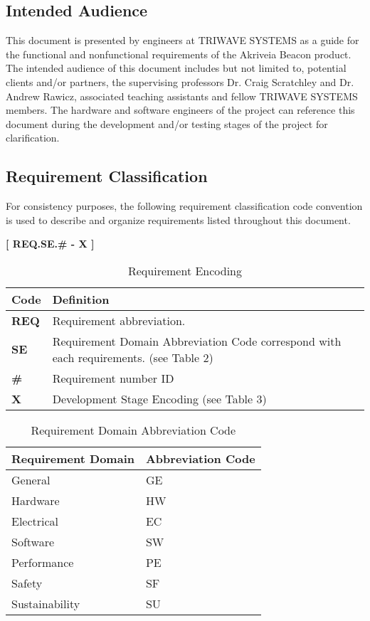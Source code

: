 \bigskip
\subsection{Intended Audience}
This document is presented by engineers at TRIWAVE SYSTEMS as a guide for the functional and nonfunctional requirements of the Akriveia Beacon product. The intended audience of this document includes but not limited to, potential clients and/or partners, the supervising professors Dr. Craig Scratchley and Dr. Andrew Rawicz, associated teaching assistants and fellow TRIWAVE SYSTEMS members. The hardware and software engineers of the project can reference this document during the development and/or testing stages of the project for clarification.

\break

\subsection{Requirement Classification}
For consistency purposes, the following requirement classification code convention is used to describe and organize requirements listed throughout this document. 
\medskip
\begin{center}
	\textbf{[ REQ.SE.\# - X ]} 
\end{center}

\bgroup
\def\arraystretch{1.5}
\begin{table}[H]
\centering
\begin{tabular}{ | m{1cm} | m{13cm}| } 
\hline
\rowcolor{lightgray} \textbf{Code} & \textbf{Definition} \\ 
\hline
 \textbf{REQ} & Requirement abbreviation.  \\ 
\hline
 \textbf{SE} & Requirement Domain Abbreviation Code correspond with each requirements. (see Table 2)\\   
\hline
 \textbf{\#} & Requirement number ID \\ 
\hline
 \textbf{X} & Development Stage Encoding (see Table 3)\\ 
\hline
\end{tabular}
\caption{Requirement Encoding}
\end{table}

\bgroup
\def\arraystretch{1.5}
\begin{table}[H]
\centering
\begin{tabular}{ | m{7cm} | m{7cm}| } 
\hline
\rowcolor{lightgray} \textbf{Requirement Domain} & \textbf{Abbreviation Code} \\ 
\hline
 General & GE\\ 
\hline
 Hardware & HW\\ 
\hline
 Electrical & EC\\  
\hline
 Software & SW\\ 
\hline
 Performance & PE\\ 
\hline
 Safety & SF\\ 
\hline
 Sustainability & SU\\ 
\hline
\end{tabular}
\caption{Requirement Domain Abbreviation Code}
\end{table}

